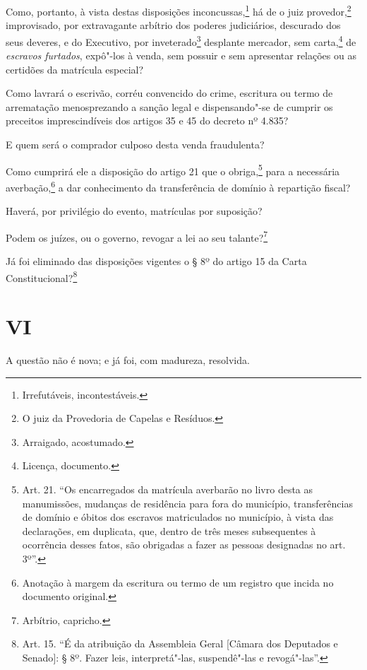 Como, portanto, à vista destas disposições inconcussas,\footnote{
  Irrefutáveis, incontestáveis.} há de o juiz provedor,\footnote{O
  juiz da Provedoria de Capelas e Resíduos.} improvisado, por
extravagante arbítrio dos poderes judiciários, descurado dos seus
deveres, e do Executivo, por inveterado\footnote{Arraigado,
  acostumado.} desplante mercador, sem carta,\footnote{Licença,
  documento.} de \emph{escravos furtados}, expô"-los à venda, sem
possuir e sem apresentar relações ou as certidões da matrícula especial?

Como lavrará o escrivão, corréu convencido do crime, escritura ou termo
de arrematação menosprezando a sanção legal e dispensando"-se de cumprir
os preceitos imprescindíveis dos artigos 35 e 45 do decreto nº 4.835?

E quem será o comprador culposo desta venda fraudulenta?

Como cumprirá ele a disposição do artigo 21 que o obriga,\footnote{
  Art. 21. ``Os encarregados da matrícula averbarão no livro desta as
  manumissões, mudanças de residência para fora do município,
  transferências de domínio e óbitos dos escravos matriculados no
  município, à vista das declarações, em duplicata, que, dentro de três
  meses subsequentes à ocorrência desses fatos, são obrigadas a fazer as
  pessoas designadas no art. 3º''.} para a necessária averbação,\footnote{
  Anotação à margem da escritura ou termo de um registro que incida no
  documento original.} a dar conhecimento da transferência de domínio à
repartição fiscal?

Haverá, por privilégio do evento, matrículas por suposição?

Podem os juízes, ou o governo, revogar a lei ao seu talante?\footnote{
  Arbítrio, capricho.}

Já foi eliminado das disposições vigentes o § 8º do artigo 15 da Carta
Constitucional?\footnote{Art. 15. ``É da atribuição da Assembleia Geral
  {[}Câmara dos Deputados e Senado{]}: § 8º. Fazer leis, interpretá"-las,
  suspendê"-las e revogá"-las''.}

\section*{VI}

A questão não é nova; e já foi, com madureza, resolvida.

